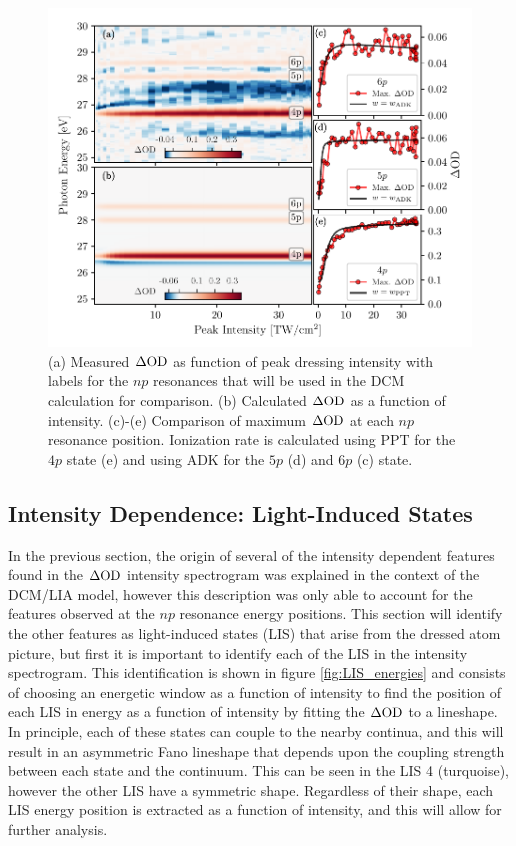 \begin{figure}
	\centering
	\includegraphics[width=1.0\textwidth]{figures/ATS/np_intensity_dep.pdf}
	\caption[Comparison of measured $\dod$ to calculated $\dod$ using DCM with LIA.]{(a) Measured $\dod$ as function of peak dressing intensity with labels for the $np$ resonances that will be used in the DCM calculation for comparison. (b) Calculated $\dod$ as a function of intensity. (c)-(e) Comparison of maximum $\dod$ at each $np$ resonance position.  Ionization rate is calculated using PPT for the $4p$ state (e) and using ADK for the $5p$ (d) and $6p$ (c) state.}
	\label{fig:np_intensity_dep}
\end{figure}

\subsection{Intensity Dependence: Light-Induced States}
\label{sec:ATS_ar_LIS}

In the previous section, the origin of several of the intensity dependent features found in the $\dod$ intensity spectrogram was explained in the context of the DCM/LIA model, however this description was only able to account for the features observed at the $np$ resonance energy positions.  This section will identify the other features as light-induced states (LIS) that arise from the dressed atom picture, but first it is important to identify each of the LIS in the intensity spectrogram.  This identification is shown in figure \ref{fig:LIS_energies} and consists of choosing an energetic window as a function of intensity to find the position of each LIS in energy as a function of intensity by fitting the $\dod$ to a lineshape.  In principle, each of these states can couple to the nearby continua, and this will result in an asymmetric Fano lineshape that depends upon the coupling strength between each state and the continuum. This can be seen in the LIS 4 (turquoise), however the other LIS have a symmetric shape. Regardless of their shape, each LIS energy position is extracted as a function of intensity, and this will allow for further analysis.

